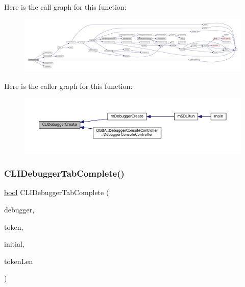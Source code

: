 Here is the call graph for this function\+:
\nopagebreak
\begin{figure}[H]
\begin{center}
\leavevmode
\includegraphics[width=350pt]{debugger_2cli-debugger_8c_a26b35228e120f0d18563af7b57826e30_cgraph}
\end{center}
\end{figure}
Here is the caller graph for this function\+:
\nopagebreak
\begin{figure}[H]
\begin{center}
\leavevmode
\includegraphics[width=350pt]{debugger_2cli-debugger_8c_a26b35228e120f0d18563af7b57826e30_icgraph}
\end{center}
\end{figure}
\mbox{\label{debugger_2cli-debugger_8c_aa4166246fff2288dedfb505e6f5936bc}} 
\subsubsection{\texorpdfstring{C\+L\+I\+Debugger\+Tab\+Complete()}{CLIDebuggerTabComplete()}}
{\footnotesize\ttfamily \mbox{\hyperlink{libretro_8h_a4a26dcae73fb7e1528214a068aca317e}{bool}} C\+L\+I\+Debugger\+Tab\+Complete (\begin{DoxyParamCaption}\item[{struct C\+L\+I\+Debugger $\ast$}]{debugger,  }\item[{const char $\ast$}]{token,  }\item[{\mbox{\hyperlink{libretro_8h_a4a26dcae73fb7e1528214a068aca317e}{bool}}}]{initial,  }\item[{size\+\_\+t}]{token\+Len }\end{DoxyParamCaption})}

